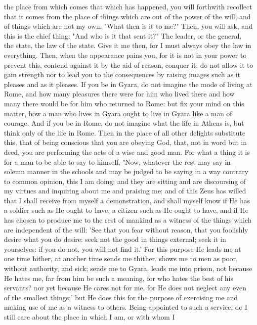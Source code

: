 \documentclass[a4paper]{article}
\begin{document}
the place from which comes that which has happened, you will forthwith
recollect that it comes from the place of things which are out of the power of
the will, and of things which are not my own. "What then is it to me?" Then,
you will ask, and this is the chief thing: "And who is it that sent it?" The
leader, or the general, the state, the law of the state. Give it me then, for I
must always obey the law in everything. Then, when the appearance pains you,
for it is not in your power to prevent this, contend against it by the aid of
reason, conquer it: do not allow it to gain strength nor to lead you to the
consequences by raising images such as it pleases and as it pleases. If you be
in Gyara, do not imagine the mode of living at Rome, and how many pleasures
there were for him who lived there and how many there would be for him who
returned to Rome: but fix your mind on this matter, how a man who lives in
Gyara ought to live in Gyara like a man of courage. And if you be in Rome, do
not imagine what the life in Athens is, but think only of the life in Rome.
    Then in the place of all other delights substitute this, that of being
conscious that you are obeying God, that, not in word but in deed, you are
performing the acts of a wise and good man. For what a thing it is for a man to
be able to say to himself, "Now, whatever the rest may say in solemn manner in
the schools and may be judged to be saying in a way contrary to common opinion,
this I am doing; and they are sitting and are discoursing of my virtues and
inquiring about me and praising me; and of this Zeus has willed that I shall
receive from myself a demonstration, and shall myself know if He has a soldier
such as He ought to have, a citizen such as He ought to have, and if He has
chosen to produce me to the rest of mankind as a witness of the things which
are independent of the will: 'See that you fear without reason, that you
foolishly desire what you do desire: seek not the good in things external; seek
it in yourselves: if you do not, you will not find it.' For this purpose He
leads me at one time hither, at another time sends me thither, shows me to men
as poor, without authority, and sick; sends me to Gyara, leads me into prison,
not because He hates me, far from him be such a meaning, for who hates the best
of his servants? nor yet because He cares not for me, for He does not neglect
any even of the smallest things;' but He does this for the purpose of
exercising me and making use of me as a witness to others. Being appointed to
such a service, do I still care about the place in which I am, or with whom I
\end{document}
